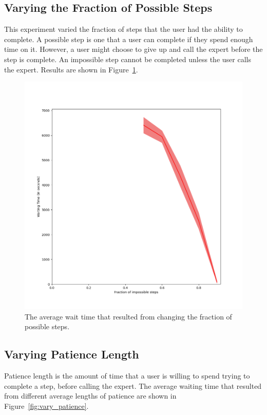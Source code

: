 \subsection{Varying the Fraction of Possible Steps}

This experiment varied the fraction of steps that the user had the ability to
complete.
A possible step is one that a user can complete if they spend enough time on it.
However, a user might choose to give up and call the expert before the step is
complete.
An impossible step cannot be completed unless the user calls the expert.
Results are shown in Figure~\ref{fig:vary_success}.

\begin{figure}[H]
  \includegraphics[width=\textwidth]{figures/montecarlo/vary_success.png}
  \caption{
    The average wait time that resulted from changing the fraction of possible
    steps.
  }\label{fig:vary_success}
\end{figure}

\subsection{Varying Patience Length}

Patience length is the amount of time that a user is willing to spend trying to
complete a step, before calling the expert.
The average waiting time that resulted from different average lengths of
patience are shown in Figure~\ref{fig:vary_patience}.

